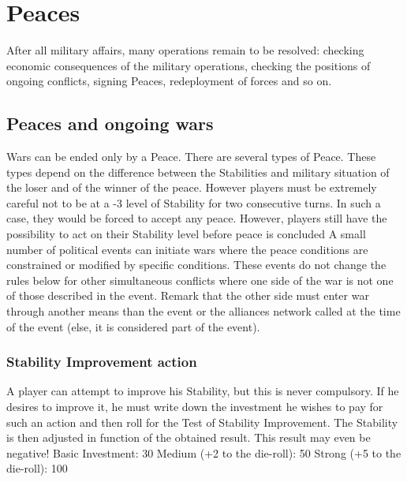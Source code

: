 
\chapter{Peaces}\label{chapter:Peace}

\aparag After all military affairs, many operations remain to be resolved:
checking economic consequences of the military operations, checking the
positions of ongoing conflicts, signing Peaces, redeployment of forces and so
on.

\PeacePhase



\section{Peaces and ongoing wars}

\aparag Wars can be ended only by a Peace. There are several types of
Peace. These types depend on the difference between the Stabilities and
military situation of the loser and of the winner of the peace. However
players must be extremely careful not to be at a -3 level of Stability for two
consecutive turns. In such a case, they would be forced to accept any
peace. However, players still have the possibility to act on their Stability
level before peace is concluded
 A small number of political
events can initiate wars where the peace conditions are constrained or
modified by specific conditions. These events do not change the rules below
for other simultaneous conflicts where one side of the war is not one of those
described in the event.
\bparag Remark that the other side must enter war through another means than
the event or the alliances network called at the time of the event (else, it
is considered part of the event).

\PeaceDetails



\subsection{Stability Improvement action}

\label{chPeace:Stability Improvement}
\aparag A player can attempt to improve his Stability, but this is never
compulsory. If he desires to improve it, he must write down the investment he
wishes to pay for such an action and then roll for the Test of Stability
Improvement. The Stability is then adjusted in function of the obtained
result. This result may even be negative!
\aparag[Investment]
\bparag Basic Investment: 30 \ducats
\bparag Medium (+2 to the die-roll): 50 \ducats
\bparag Strong (+5 to the die-roll): 100 \ducats

